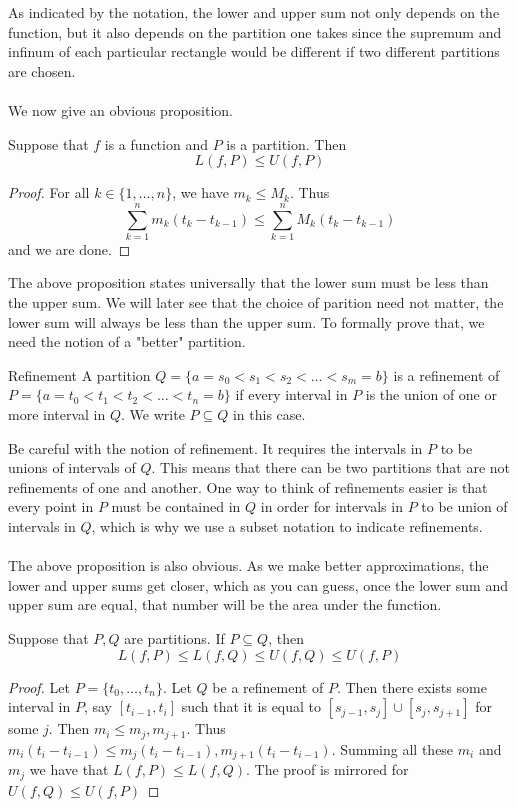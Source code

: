 \documentclass[a4paper]{article}
\begin{document}
As indicated by the notation, the lower and upper sum not only depends on the function, but it also depends on the partition one takes since the supremum and infinum of each particular rectangle would be different if two different partitions are chosen. \\~\\
We now give an obvious proposition. 

\begin{prp}{}{} Suppose that $f$ is a function and $P$ is a partition. Then $$L(f,P)\leq U(f,P)$$ \tcbline
\begin{proof} For all $k\in\{1,\dots,n\}$, we have $m_k\leq M_k$. Thus $$\sum_{k=1}^nm_k(t_k-t_{k-1})\leq\sum_{k=1}^nM_k(t_k-t_{k-1})$$ and we are done. 
\end{proof}
\end{prp}

The above proposition states universally that the lower sum must be less than the upper sum. We will later see that the choice of parition need not matter, the lower sum will always be less than the upper sum. To formally prove that, we need the notion of a "better" partition. 

\begin{defn}{Refinement}{} A partition $Q=\{a=s_0<s_1<s_2<\dots<s_m=b\}$ is a refinement of $P=\{a=t_0<t_1<t_2<\dots<t_n=b\}$ if every interval in $P$ is the union of one or more interval in $Q$. We write $P\subseteq Q$ in this case. 
\end{defn}

Be careful with the notion of refinement. It requires the intervals in $P$ to be unions of intervals of $Q$. This means that there can be two partitions that are not refinements of one and another. One way to think of refinements easier is that every point in $P$ must be contained in $Q$ in order for intervals in $P$ to be union of intervals in $Q$, which is why we use a subset notation to indicate refinements. \\~\\
The above proposition is also obvious. As we make better approximations, the lower and upper sums get closer, which as you can guess, once the lower sum and upper sum are equal, that number will be the area under the function. 

\begin{prp}{}{} Suppose that $P,Q$ are partitions. If $P\subseteq Q$, then $$L(f,P)\leq L(f,Q)\leq U(f,Q)\leq U(f,P)$$ \tcbline
\begin{proof} Let $P=\{t_0,\dots,t_n\}$. Let $Q$ be a refinement of $P$. Then there exists some interval in $P$, say $[t_{i-1},t_i]$ such that it is equal to $[s_{j-1},s_j]\cup[s_j,s_{j+1}]$ for some $j$. Then $m_i\leq m_j,m_{j+1}$. Thus $m_i(t_i-t_{i-1})\leq m_j(t_i-t_{i-1}),m_{j+1}(t_i-t_{i-1})$. Summing all these $m_i$ and $m_j$ we have that $L(f,P)\leq L(f,Q)$. The proof is mirrored for $U(f,Q)\leq U(f,P)$
\end{proof}
\end{prp}
\end{document}

